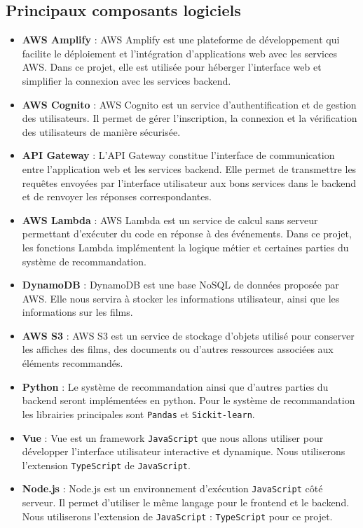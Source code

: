 \documentclass[a4paper,12pt]{report}
\begin{document}
\subsection{Principaux composants logiciels}
\begin{itemize}
    \item \textbf{AWS Amplify} : AWS Amplify est une plateforme de développement qui facilite le déploiement et l’intégration d’applications web avec les services AWS. Dans ce projet, elle est utilisée pour héberger l’interface web et simplifier la connexion avec les services backend.
    \item \textbf{AWS Cognito} : AWS Cognito est un service d’authentification et de gestion des utilisateurs. Il permet de gérer l’inscription, la connexion et la vérification des utilisateurs de manière sécurisée.
    \item \textbf{API Gateway} : L’API Gateway constitue l’interface de communication entre l’application web et les services backend. Elle permet de transmettre les requêtes envoyées par l'interface utilisateur aux bons services dans le backend et de renvoyer les réponses correspondantes. 
    \item \textbf{AWS Lambda} : AWS Lambda est un service de calcul sans serveur permettant d’exécuter du code en réponse à des événements. Dans ce projet, les fonctions Lambda implémentent la logique métier et certaines parties du système de recommandation.  
    \item \textbf{DynamoDB} : DynamoDB est une base NoSQL de données proposée par AWS. Elle nous servira à stocker les informations utilisateur, ainsi que les informations sur les films.
    \item \textbf{AWS S3} : AWS S3 est un service de stockage d’objets utilisé pour conserver les affiches des films, des documents ou d’autres ressources associées aux éléments recommandés.
    \item \textbf{Python} : Le système de recommandation ainsi que d'autres parties du backend seront implémentées en python. Pour le système de recommandation les librairies principales sont \texttt{Pandas} et \texttt{Sickit-learn}.
    \item \textbf{Vue} : Vue est un framework \texttt{JavaScript} que nous allons utiliser pour développer l'interface utilisateur interactive et dynamique. Nous utiliserons l'extension \texttt{TypeScript} de \texttt{JavaScript}.
    \item \textbf{Node.js} : Node.js est un environnement d’exécution \texttt{JavaScript} côté serveur. Il permet d'utiliser le même langage pour le frontend et le backend. Nous utiliserons l'extension de \texttt{JavaScript} : \texttt{TypeScript} pour ce projet.
\end{itemize}
\end{document}
